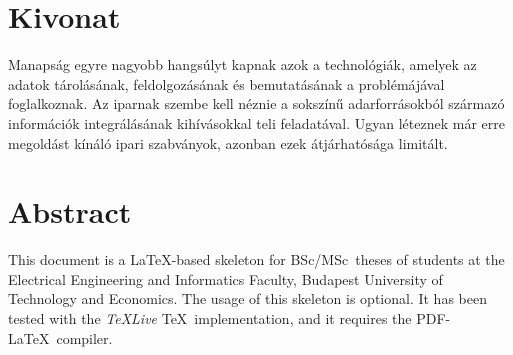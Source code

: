 \setcounter{page}{1}

\selecthungarian

\chapter*{Kivonat}

Manapság egyre nagyobb hangsúlyt kapnak azok a technológiák, amelyek az adatok tárolásának, feldolgozásának és bemutatásának a problémájával foglalkoznak. Az iparnak szembe kell néznie a sokszínű adarforrásokból származó információk integrálásának kihívásokkal teli feladatával. Ugyan léteznek már erre megoldást kínáló ipari szabványok, azonban ezek átjárhatósága limitált.


\vfill
\selectenglish


\chapter*{Abstract}

This document is a \LaTeX-based skeleton for BSc/MSc~theses of students at the Electrical Engineering and Informatics Faculty, Budapest University of Technology and Economics. The usage of this skeleton is optional. It has been tested with the \emph{TeXLive} \TeX~implementation, and it requires the PDF-\LaTeX~compiler.


\vfill
\selectthesislanguage

\setcounter{romanPage}{\value{page}}
